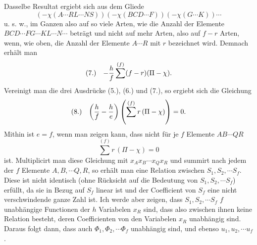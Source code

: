 \documentclass[11pt]{article}
\makeatletter
\newcommand{\frobtagc}[2]{\[\begin{array}{@{}r@{\quad}c@{}}\textup{(#1)} & \displaystyle #2\end{array}\]}
\makeatother
\begin{document}
Dasselbe Resultat ergiebt sich aus dem Gliede
\[
(-\chi(A\cdots RL\cdots NS))(-\chi(BCD\cdots F))(-\chi(G\cdots K))\cdots
\]
u. s. w., im Ganzen also auf so viele Arten, wie die Anzahl der Elemente $BCD\cdots\allowbreak FG\cdots\allowbreak KL\cdots\allowbreak N\cdots$ beträgt und nicht auf mehr Arten, also auf $f-r$ Arten, wenn, wie oben, die Anzahl der Elemente $A\cdots R$ mit $r$ bezeichnet wird. Demnach erhält man
\frobtagc{7.}{-\frac{h}{f}\sum^{(f)}(f-r)(\Pi-\chi).}
Vereinigt man die drei Ausdrücke (5.), (6.) und (7.), so ergiebt sich die Gleichung
\frobtagc{8.}{\left(\frac{h}{f}-\frac{h}{e}\right)\left(\sum^{(f)}r\,(\Pi-\chi)\right)=0.}
Mithin ist $e=f$, wenn man zeigen kann, dass nicht für je $f$ Elemente $AB\cdots QR$
\[
\sum^{(f)}r\,(\Pi-\chi)=0
\]
ist. Multiplicirt man diese Gleichung mit $x_Ax_B\cdots x_Qx_R$ und summirt nach jedem der $f$ Elemente $A,B,\cdots Q,R$, so erhält man eine Relation zwischen $S_1,S_2,\cdots S_f$. Diese ist nicht identisch (ohne Rücksicht auf die Bedeutung von $S_1,S_2,\cdots S_f$) erfüllt, da sie in Bezug auf $S_f$ linear ist und der Coefficient von $S_f$ eine nicht verschwindende ganze Zahl ist. Ich werde aber zeigen, dass $S_1,S_2,\cdots S_f$ $f$ unabhängige Functionen der $h$ Variabelen $x_R$ sind, dass also zwischen ihnen keine Relation besteht, deren Coefficienten von den Variabelen $x_R$ unabhängig sind. Daraus folgt dann, dass auch $\Phi_1,\Phi_2,\cdots\Phi_f$ unabhängig sind, und ebenso $u_1,u_2,\cdots u_f$.
\end{document}
